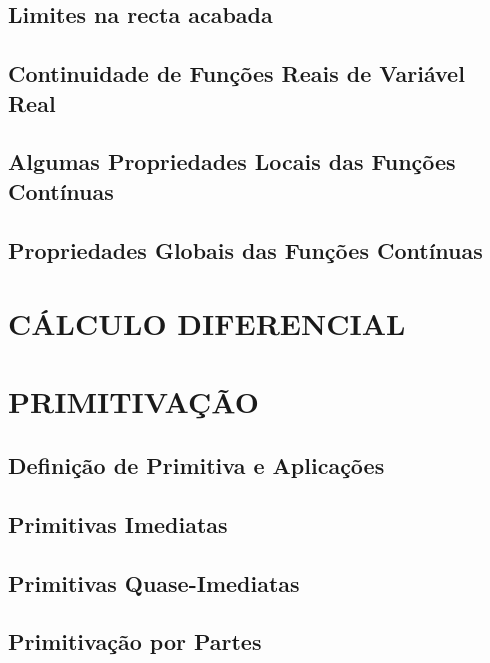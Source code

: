 \documentclass[11pt]{article}
\begin{document}
\subsection{Limites na recta acabada}

\subsection{Continuidade de Funções Reais de Variável Real}

\subsection{Algumas Propriedades Locais das Funções Contínuas}

\subsection{Propriedades Globais das Funções Contínuas}



\newpage

\section{\MakeUppercase{Cálculo Diferencial}}



\newpage

\section{\MakeUppercase{Primitivação}}

\subsection{Definição de Primitiva e Aplicações}

\subsection{Primitivas Imediatas}

\subsection{Primitivas Quase-Imediatas}

\subsection{Primitivação por Partes}
\end{document}
